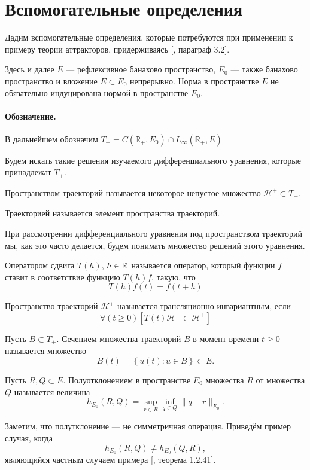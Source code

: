 \section{Вспомогательные определения}

Дадим вспомогательные определения, которые потребуются при применении к примеру теории аттракторов,
придерживаясь [\cite{Zelenaya}, параграф 3.2].

Здесь и далее $E$ --- рефлексивное банахово пространство,
$E_0$ --- также банахово пространство и вложение $E \subset E_0$ непрерывно.
Норма в пространстве $E$ не обязательно индуцирована нормой в пространстве $E_0$.

\paragraph{Обозначение.}
В дальнейшем обозначим $T_+ = C(\mathbb{R}_+,E_0) \cap L_\infty(\mathbb{R}_+,E)$

Будем искать такие решения изучаемого дифференциального уравнения,
которые принадлежат $T_+$.


\opred
Пространством траекторий называется некоторое непустое множество $\mathcal{H}^+ \subset T_+$.

\opred
Траекторией называется элемент пространства траекторий.

При рассмотрении дифференциального уравнения под пространством траекторий мы, как это часто делается,
будем понимать множество решений этого уравнения.


\opred
Оператором сдвига $T(h)$, $h\in\mathbb{R}$ называется оператор, который функции $f$ ставит в соответствие функцию $T(h)f$, такую, что
$$
T(h)f(t)=f(t+h)
$$


\opred
Пространство траекторий $\mathcal{H}^+$ называется трансляционно инвариантным, если
$$
\forall(t \geq 0)\left[T(t)\mathcal{H}^+ \subset \mathcal{H}^+ \right]
$$

\opred

Пусть $B \subset T_+$.
Сечением множества траекторий $B$ в момент времени $t \geq 0$ называется множество
$$
	B(t)=\left\{u(t) : u \in B \right\} \subset E.
$$


\opred

Пусть $R,Q \subset E$.
Полуотклонением в пространстве $E_0$ множества $R$ от множества $Q$ называется величина
$$
	h_{E_0}(R,Q) = \sup_{r\in R} \inf_{q \in Q} \| q - r \|_{E_0}.
$$

Заметим, что полутклонение --- не симметричная операция.
Приведём пример случая, когда
$$
	h_{E_0}(R,Q) \neq h_{E_0}(Q,R),
$$
являющийся частным случаем примера [\cite{mnogozn}, теорема 1.2.41].

